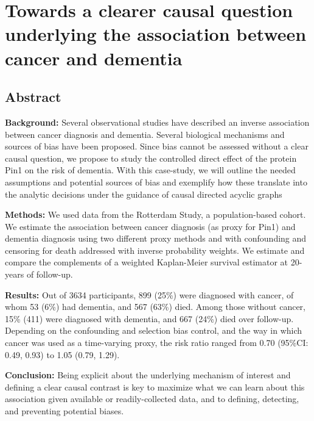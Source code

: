 \documentclass[
]{book}
\begin{document}
\hypertarget{chapter4}{%
\chapter{Towards a clearer causal question underlying the association between cancer and dementia}\label{chapter4}}


\newpage

\hypertarget{abstract-2}{%
\section{Abstract}\label{abstract-2}}

\textbf{Background:} Several observational studies have described an inverse association between cancer diagnosis and dementia. Several biological mechanisms and sources of bias have been proposed. Since bias cannot be assessed without a clear causal question, we propose to study the controlled direct effect of the protein Pin1 on the risk of dementia. With this case-study, we will outline the needed assumptions and potential sources of bias and exemplify how these translate into the analytic decisions under the guidance of causal directed acyclic graphs

\textbf{Methods:} We used data from the Rotterdam Study, a population-based cohort. We estimate the association between cancer diagnosis (as proxy for Pin1) and dementia diagnosis using two different proxy methods and with confounding and censoring for death addressed with inverse probability weights. We estimate and compare the complements of a weighted Kaplan-Meier survival estimator at 20-years of follow-up.

\textbf{Results:} Out of 3634 participants, 899 (25\%) were diagnosed with cancer, of whom 53 (6\%) had dementia, and 567 (63\%) died. Among those without cancer, 15\% (411) were diagnosed with dementia, and 667 (24\%) died over follow-up. Depending on the confounding and selection bias control, and the way in which cancer was used as a time-varying proxy, the risk ratio ranged from 0.70 (95\%CI: 0.49, 0.93) to 1.05 (0.79, 1.29).

\textbf{Conclusion:} Being explicit about the underlying mechanism of interest and defining a clear causal contrast is key to maximize what we can learn about this association given available or readily-collected data, and to defining, detecting, and preventing potential biases.

\newpage
\end{document}
